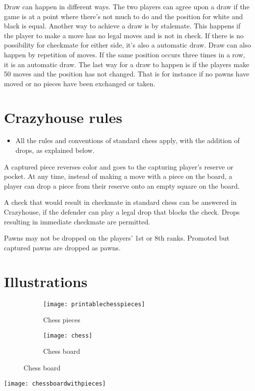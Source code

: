 \documentclass{article}
\begin{document}
\begin{description}[align=right]
\item [Draw:] \hspace{6mm} Draw can happen in different ways. The two players can agree upon a draw if the game is at a point where there's not much to do and the position for white and black is equal. Another way to achieve a draw is by stalemate. This happens if the player to make a move has no legal moves and is not in check. If there is no possibility for checkmate for either side, it's also a automatic draw. Draw can also happen by repetition of moves. If the same position occurs three times in a row, it is an automatic draw. The last way for a draw to happen is if the players make 50 moves and the position has not changed. That is for instance if no pawns have moved or no pieces have been exchanged or taken.
\end{description}
\section{Crazyhouse rules}
\begin{itemize}
\item All the rules and conventions of standard chess apply, with the addition of drops, as explained below.
\end{itemize}
\begin{description}[align=right]
\item [Drop:] \hspace{6mm} A captured piece reverses color and goes to the capturing player's reserve or pocket. At any time, instead of making a move with a piece on the board, a player can drop a piece from their reserve onto an empty square on the board.
\item [Check mate:] \hspace{6mm} A check that would result in checkmate in standard chess can be answered in Crazyhouse, if the defender can play a legal drop that blocks the check. Drops resulting in immediate checkmate are permitted.
\item [Pawns:] \hspace{6mm} Pawns may not be dropped on the players' 1st or 8th ranks. Promoted but captured pawns are dropped as pawns.
\end{description}


\section{Illustrations}
\begin{figure} [h!]
	\begin{subfigure}[b]{0.5\textwidth}
		\texttt{[image: printablechesspieces]}
        \caption{Chess pieces}
        \label{fig:printablechesspieces}
	\end{subfigure}
    \begin{subfigure}[b]{0.5\textwidth}
		\texttt{[image: chess]}
        \caption{Chess board}
        \label{fig:chess}
	\end{subfigure}

\end{figure}
\texttt{[image: chessboardwithpieces]}
\end{document}
